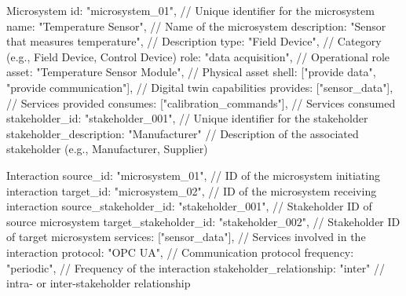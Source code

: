 Microsystem {
    id: "microsystem_01",  // Unique identifier for the microsystem
    name: "Temperature Sensor",  // Name of the microsystem
    description: "Sensor that measures temperature",  // Description
    type: "Field Device",  // Category (e.g., Field Device, Control Device)
    role: "data acquisition",  // Operational role
    asset: "Temperature Sensor Module",  // Physical asset
    shell: ["provide data", "provide communication"],  // Digital twin capabilities
    provides: ["sensor_data"],  // Services provided
    consumes: ["calibration_commands"],  // Services consumed
    stakeholder_id: "stakeholder_001",  // Unique identifier for the stakeholder
    stakeholder_description: "Manufacturer"  // Description of the associated stakeholder (e.g., Manufacturer, Supplier)
}

Interaction {
    source_id: "microsystem_01",  // ID of the microsystem initiating interaction
    target_id: "microsystem_02",  // ID of the microsystem receiving interaction
    source_stakeholder_id: "stakeholder_001",  // Stakeholder ID of source microsystem
    target_stakeholder_id: "stakeholder_002",  // Stakeholder ID of target microsystem
    services: ["sensor_data"],  // Services involved in the interaction
    protocol: "OPC UA",  // Communication protocol
    frequency: "periodic",  // Frequency of the interaction
    stakeholder_relationship: "inter"  // intra- or inter-stakeholder relationship
}
